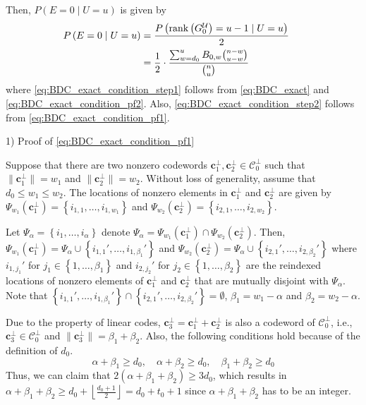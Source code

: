 \documentclass[10pt,twocolumn,twoside,submit]{JCNtran}
\DeclareMathOperator{\rank}{rank}
\begin{document}
	Then, $P\left(E=0 \mid U=u \right)$ is given by
	\begin{align}
	\hspace{-5mm}P\left(E=0 \mid U=u \right) 
		&= \frac{P \left( \rank \left( G_0^{\mathcal{U}} \right) = u - 1 \mid U=u \right)}{2}  \label{eq:BDC_exact_condition_step1}\\
	    &= \frac{1}{2} \cdot \frac{\sum_{w=d_{0}}^{u}{B_{0, w} \binom{n-w}{u-w}}}{\binom{n}{u}} \label{eq:BDC_exact_condition_step2}
	\end{align}
	where \eqref{eq:BDC_exact_condition_step1} follows from \eqref{eq:BDC_exact} and \eqref{eq:BDC_exact_condition_pf2}. Also, \eqref{eq:BDC_exact_condition_step2} follows from \eqref{eq:BDC_exact_condition_pf1}.
	
	1) Proof of \eqref{eq:BDC_exact_condition_pf1}
	
	Suppose that there are two nonzero codewords ${\mathbf{c}}_1^{\perp}, {\mathbf{c}}_2^{\perp} \in {\mathcal{C}}_0^{\perp}$ such that $\|{\mathbf{c}}_1^{\perp}\| = w_1$ and $\|{\mathbf{c}}_2^{\perp}\| = w_2$. Without loss of generality, assume that $d_0 \le w_1 \le w_2$. The locations of nonzero elements in ${\mathbf{c}}_1^{\perp}$ and ${\mathbf{c}}_2^{\perp}$ are given by $	\Psi_{w_1}\left({\mathbf{c}}_1^{\perp}\right)= \left\{ i_{1,1},\ldots,i_{1, w_1} \right\}$ and $	\Psi_{w_2}\left({\mathbf{c}}_2^{\perp}\right)= \left\{ i_{2,1},\ldots,i_{2, w_2} \right\}$. 
	
	Let $\Psi_{\alpha}=\left\{i_1, \ldots, i_{\alpha} \right\}$ denote $\Psi_{\alpha} = \Psi_{w_1}\left({\mathbf{c}}_1^{\perp}\right) \cap \Psi_{w_2}\left({\mathbf{c}}_2^{\perp}\right)$. Then,  $\Psi_{w_1}\left({\mathbf{c}}_1^{\perp}\right) = \Psi_{\alpha} \cup \left\{ i_{1,1}',\ldots,i_{1, \beta_1}' \right\}$ and $\Psi_{w_2}\left({\mathbf{c}}_2^{\perp}\right) = \Psi_{\alpha} \cup \left\{ i_{2,1}',\ldots,i_{2, \beta_2}' \right\}$ where $i_{1, j_1}'$ for $j_1 \in \left\{1, \ldots, \beta_1 \right\}$ and $i_{2, j_2}'$ for $j_2 \in \left\{1, \ldots, \beta_2 \right\}$ are the reindexed locations of nonzero elements of ${\mathbf{c}}_1^{\perp}$ and ${\mathbf{c}}_2^{\perp}$ that are mutually disjoint with $\Psi_{\alpha}$. Note that $\left\{ i_{1,1}',\ldots,i_{1, \beta_1}' \right\} \cap \left\{ i_{2,1}',\ldots,i_{2, \beta_2}' \right\} = \emptyset $, $\beta_1 = w_1 - \alpha$ and $\beta_2 = w_2 - \alpha$.
	
	Due to the property of linear codes, ${\mathbf{c}}_3^{\perp} = {\mathbf{c}}_1^{\perp} + {\mathbf{c}}_2^{\perp}$ is also a codeword of ${\mathcal{C}}_0^{\perp}$, i.e., ${\mathbf{c}}_3^{\perp} \in {\mathcal{C}}_0^{\perp}$ and $\|{\mathbf{c}}_3^{\perp} \|=\beta_1 + \beta_2$. Also, the following conditions hold because of the definition of $d_0$.
	\begin{equation*}
		\alpha + \beta_1 \ge d_0, \quad \alpha + \beta_2 \ge d_0, \quad 	\beta_1 + \beta_2 \ge d_0
	\end{equation*}
	Thus, we can claim that $2 \left( \alpha + \beta_1 + \beta_2 \right) \ge 3 d_0$, which results in $\alpha + \beta_1 + \beta_2 \ge d_0 + \left\lfloor \frac{d_0 + 1}{2} \right\rfloor = d_0 + t_0 + 1$ since $\alpha + \beta_1 + \beta_2$ has to be an integer.
	
\end{document}
